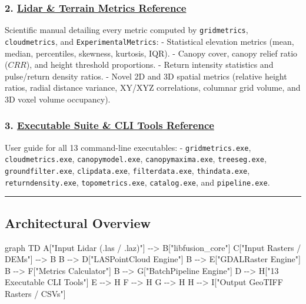 \documentclass[
]{article}
\newenvironment{Shaded}{\begin{snugshade}}{\end{snugshade}}
\newcommand{\NormalTok}[1]{\textcolor[rgb]{0.00,0.23,0.31}{#1}}
\begin{document}
\subsubsection{\texorpdfstring{2. \href{METRICS_REFERENCE.md}{Lidar \&
Terrain Metrics
Reference}}{2. Lidar \& Terrain Metrics Reference}}\label{lidar-terrain-metrics-reference}

Scientific manual detailing every metric computed by
\texttt{gridmetrics}, \texttt{cloudmetrics}, and
\texttt{ExperimentalMetrics}: - Statistical elevation metrics (mean,
median, percentiles, skewness, kurtosis, IQR). - Canopy cover, canopy
relief ratio (\(CRR\)), and height threshold proportions. - Return
intensity statistics and pulse/return density ratios. - Novel 2D and 3D
spatial metrics (relative height ratios, radial distance variance,
XY/XYZ correlations, columnar grid volume, and 3D voxel volume
occupancy).

\subsubsection{\texorpdfstring{3.
\href{CLI_TOOLS_REFERENCE.md}{Executable Suite \& CLI Tools
Reference}}{3. Executable Suite \& CLI Tools Reference}}\label{executable-suite-cli-tools-reference}

User guide for all 13 command-line executables: -
\texttt{gridmetrics.exe}, \texttt{cloudmetrics.exe},
\texttt{canopymodel.exe}, \texttt{canopymaxima.exe},
\texttt{treeseg.exe}, \texttt{groundfilter.exe}, \texttt{clipdata.exe},
\texttt{filterdata.exe}, \texttt{thindata.exe},
\texttt{returndensity.exe}, \texttt{topometrics.exe},
\texttt{catalog.exe}, and \texttt{pipeline.exe}.

\begin{center}\rule{0.5\linewidth}{0.5pt}\end{center}

\subsection{Architectural Overview}\label{architectural-overview}

\begin{Shaded}
\begin{Highlighting}[]
\NormalTok{graph TD}
\NormalTok{    A["Input Lidar (.las / .laz)"] {-}{-}\textgreater{} B["libfusion\_core"]}
\NormalTok{    C["Input Rasters / DEMs"] {-}{-}\textgreater{} B}
\NormalTok{    B {-}{-}\textgreater{} D["LASPointCloud Engine"]}
\NormalTok{    B {-}{-}\textgreater{} E["GDALRaster Engine"]}
\NormalTok{    B {-}{-}\textgreater{} F["Metrics Calculator"]}
\NormalTok{    B {-}{-}\textgreater{} G["BatchPipeline Engine"]}
\NormalTok{    D {-}{-}\textgreater{} H["13 Executable CLI Tools"]}
\NormalTok{    E {-}{-}\textgreater{} H}
\NormalTok{    F {-}{-}\textgreater{} H}
\NormalTok{    G {-}{-}\textgreater{} H}
\NormalTok{    H {-}{-}\textgreater{} I["Output GeoTIFF Rasters / CSVs"]}
\end{Highlighting}
\end{Shaded}
\end{document}
